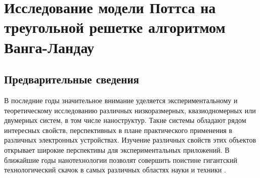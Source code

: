 ﻿

\section{Исследование модели Поттса на треугольной решетке алгоритмом Ванга-Ландау}



%
%
%




\subsection{Предварительные сведения}


В последние годы  значительное внимание уделяется экспериментальному и теоретическому исследованию различных низкоразмерных, квазиодномерных или двумерных систем, в том числе наноструктур. Такие системы обладают рядом интересных свойств, перспективных в плане практического применения в различных электронных устройствах. Изучение различных свойств этих объектов открывает широкие перспективы для экспериментальных приложений. В ближайшие годы нанотехнологии позволят совершить поистине гигантский технологический скачок в самых различных областях науки и техники \cite{ph3_1}.

